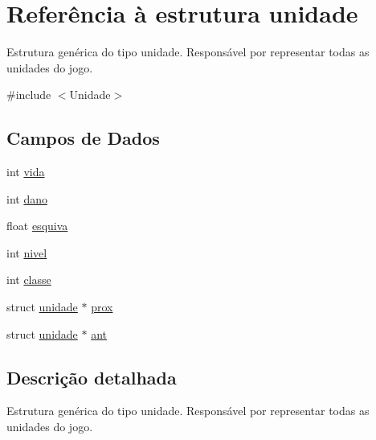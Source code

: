 \hypertarget{structunidade}{\section{\-Referência à estrutura unidade}
\label{structunidade}
}


\-Estrutura genérica do tipo unidade. \-Responsável por representar todas as unidades do jogo.  




{\ttfamily \#include $<$\-Unidade$>$}

\subsection*{\-Campos de \-Dados}
\begin{DoxyCompactItemize}
\item 
int \hyperlink{structunidade_a5ad38abe22f6739f387e4653850ed5ee}{vida}
\item 
int \hyperlink{structunidade_a8f9411cc7c2f4b7a3800e807ea85e606}{dano}
\item 
float \hyperlink{structunidade_ace4fd16342645758350afa447a9827e5}{esquiva}
\item 
int \hyperlink{structunidade_afafcd32854d6f6b1c4cd3cca8f1315a7}{nivel}
\item 
int \hyperlink{structunidade_a6dba0a17b4b24adfd8eef72687d3f0da}{classe}
\item 
struct \hyperlink{structunidade}{unidade} $\ast$ \hyperlink{structunidade_a7f4ce5c1013e03c4e99c3772904235e5}{prox}
\item 
struct \hyperlink{structunidade}{unidade} $\ast$ \hyperlink{structunidade_ae95a7a2ca6d4e4458fa7775580a3b304}{ant}
\end{DoxyCompactItemize}


\subsection{\-Descrição detalhada}
\-Estrutura genérica do tipo unidade. \-Responsável por representar todas as unidades do jogo. 

